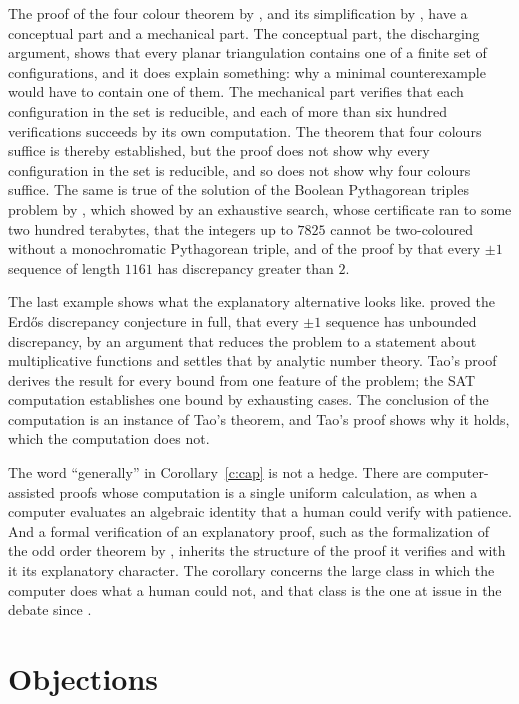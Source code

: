 \documentclass{situationist-preprint}
\begin{document}
The proof of the four colour theorem by \citet{AppelHaken1977}, and its simplification by \citet{RobertsonEtAl1997}, have a conceptual part and a mechanical part. The conceptual part, the discharging argument, shows that every planar triangulation contains one of a finite set of configurations, and it does explain something: why a minimal counterexample would have to contain one of them. The mechanical part verifies that each configuration in the set is reducible, and each of more than six hundred verifications succeeds by its own computation. The theorem that four colours suffice is thereby established, but the proof does not show why every configuration in the set is reducible, and so does not show why four colours suffice. The same is true of the solution of the Boolean Pythagorean triples problem by \citet{HeuleEtAl2016}, which showed by an exhaustive search, whose certificate ran to some two hundred terabytes, that the integers up to $7825$ cannot be two-coloured without a monochromatic Pythagorean triple, and of the proof by \citet{KonevLisitsa2014} that every $\pm 1$ sequence of length $1161$ has discrepancy greater than $2$.

The last example shows what the explanatory alternative looks like. \citet{Tao2016} proved the Erd\H{o}s discrepancy conjecture in full, that every $\pm 1$ sequence has unbounded discrepancy, by an argument that reduces the problem to a statement about multiplicative functions and settles that by analytic number theory. Tao's proof derives the result for every bound from one feature of the problem; the SAT computation establishes one bound by exhausting cases. The conclusion of the computation is an instance of Tao's theorem, and Tao's proof shows why it holds, which the computation does not.

The word ``generally'' in Corollary~\ref{c:cap} is not a hedge. There are computer-assisted proofs whose computation is a single uniform calculation, as when a computer evaluates an algebraic identity that a human could verify with patience. And a formal verification of an explanatory proof, such as the formalization of the odd order theorem by \citet{GonthierEtAl2013}, inherits the structure of the proof it verifies and with it its explanatory character. The corollary concerns the large class in which the computer does what a human could not, and that class is the one at issue in the debate since \citet{Tymoczko1979}.

\section{Objections}
\end{document}
